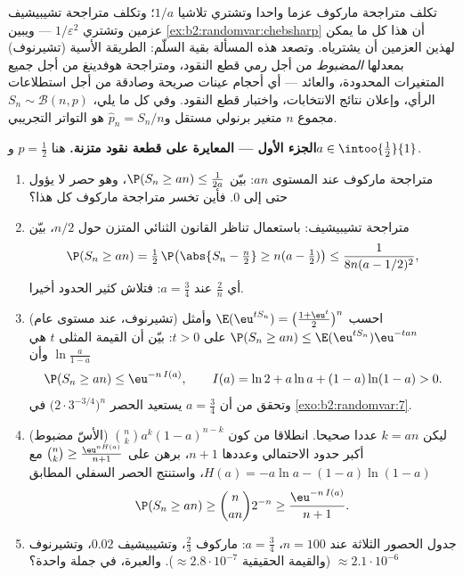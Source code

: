 \begin{problem}
\label{pb:b2:randomvar:1}
تكلف متراجحة ماركوف عزما واحدا وتشتري تلاشيا $1/a$؛ وتكلف متراجحة
تشيبيشيف عزمين وتشتري $1/\varepsilon^2$ --- ويبين \cref{ex:b2:randomvar:chebsharp} أن هذا كل ما يمكن
لهذين العزمين أن يشترياه. وتصعد هذه المسألة بقية السلّم: الطريقة
الأسية (تشيرنوف) بمعدلها \emph{المضبوط} من أجل رمي قطع النقود،
ومتراجحة هوفدينغ من أجل جميع المتغيرات المحدودة، والعائد --- أي
أحجام عينات صريحة وصادقة من أجل استطلاعات الرأي، وإعلان نتائج
الانتخابات، واختبار قطع النقود.
وفي كل ما يلي، $S_n \sim
\mathcal B(n, p)$ مجموع $n$ متغير برنولي مستقل و$\widehat p_n = S_n/n$ هو
التواتر التجريبي.

\medskip
\noindent\textbf{الجزء الأول --- المعايرة على قطعة نقود متزنة.}
هنا $p = \frac12$ و$a \in \intoo{\frac12}{1}$.
\begin{enumerate}
  \item متراجحة ماركوف عند المستوى $an$: بيّن $\P(S_n \geq an) \leq
        \frac1{2a}$، وهو حصر لا
        يؤول حتى إلى $0$. فأين تخسر متراجحة ماركوف كل هذا؟
  \item متراجحة تشيبيشيف: باستعمال تناظر القانون الثنائي المتزن حول
        $n/2$، بيّن
        \[
        \P(S_n \geq an) = \tfrac12\,
        \P\bigl(\abs{S_n - \tfrac n2} \geq n(a -
        \tfrac12)\bigr)
        \leq \frac{1}{8n(a - 1/2)^2},
        \]
        أي $\frac2n$ عند $a = \frac34$: فتلاش كثير الحدود أخيرا.
  \item (تشيرنوف، عند مستوى عام) احسب $\E(\eu^{tS_n}) = \bigl(\frac{1 + \eu^t}2\bigr)^n$ وأمثل $\P(S_n \geq an) \leq
        \E(\eu^{tS_n})\eu^{-tan}$ على
        $t > 0$: بيّن أن القيمة المثلى $t$ هي $\ln\frac{a}{1-a}$ وأن
        \[
        \P(S_n \geq an) \leq \eu^{-n\,I(a)},
        \qquad
        I(a) = \ln 2 + a\ln a + (1-a)\ln(1-a) > 0 .
        \]
        وتحقق من أن $a = \frac34$ يستعيد الحصر $\bigl(2\cdot3^{-3/4}\bigr)^n$ في \cref{exo:b2:randomvar:7}.
  \item (الأسّ مضبوط) ليكن $k = an$ عددا صحيحا. انطلاقا من كون $\binom nk a^k(1-a)^{n-k}$
        أكبر حدود  الاحتمالي وعددها $n + 1$، برهن على $\binom nk \geq
        \frac{\eu^{nH(a)}}{n+1}$
        مع $H(a) = -a\ln a -
        (1-a)\ln(1-a)$، واستنتج الحصر السفلي المطابق
        \[
        \P(S_n \geq an) \geq \binom{n}{an}2^{-n}
        \geq \frac{\eu^{-n\,I(a)}}{n + 1} .
        \]
  \item جدول الحصور الثلاثة عند $n = 100$، $a =
        \frac34$: ماركوف $\frac23$،
        وتشيبيشيف $0.02$، وتشيرنوف $\approx 2.1\cdot10^{-6}$ (والقيمة الحقيقية $\approx 2.8\cdot10^{-7}$).
        والعبرة، في جملة واحدة؟
\end{enumerate}


\end{problem}
